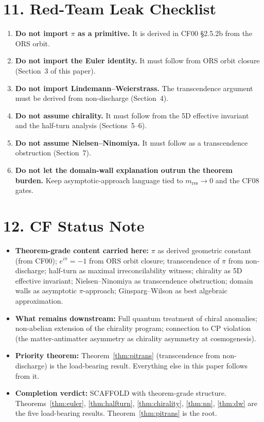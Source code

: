 \documentclass[11pt]{article}
\theoremstyle{definition}
\theoremstyle{remark}
\begin{document}
\section{11. Red-Team Leak Checklist}

\begin{enumerate}[label=\textbf{R\arabic*.},leftmargin=1.8em]
\item \textbf{Do not import $\pi$ as a primitive.} It is derived in
  CF00 \S 2.5.2b from the ORS orbit.
\item \textbf{Do not import the Euler identity.} It must follow from
  ORS orbit closure (Section~3 of this paper).
\item \textbf{Do not import Lindemann--Weierstrass.} The transcendence
  argument must be derived from non-discharge (Section~4).
\item \textbf{Do not assume chirality.} It must follow from the 5D
  effective invariant and the half-turn analysis (Sections~5--6).
\item \textbf{Do not assume Nielsen--Ninomiya.} It must follow as a
  transcendence obstruction (Section~7).
\item \textbf{Do not let the domain-wall explanation outrun the
  theorem burden.} Keep asymptotic-approach language tied to
  $m_\text{res}\to 0$ and the CF08 gates.
\end{enumerate}

\section{12. CF Status Note}

\begin{itemize}
\item \textbf{Theorem-grade content carried here:} $\pi$ as derived
  geometric constant (from CF00); $e^{i\pi}=-1$ from ORS orbit closure;
  transcendence of $\pi$ from non-discharge; half-turn as maximal
  irreconcilability witness; chirality as 5D effective invariant;
  Nielsen--Ninomiya as transcendence obstruction; domain walls as
  asymptotic $\pi$-approach; Ginsparg--Wilson as best algebraic
  approximation.
\item \textbf{What remains downstream:} Full quantum treatment of
  chiral anomalies; non-abelian extension of the chirality program;
  connection to CP violation (the matter-antimatter asymmetry as
  chirality asymmetry at cosmogenesis).
\item \textbf{Priority theorem:} Theorem~\ref{thm:pitrans}
  (transcendence from non-discharge) is the load-bearing result.
  Everything else in this paper follows from it.
\item \textbf{Completion verdict:} SCAFFOLD with theorem-grade structure.
  Theorems~\ref{thm:euler}, \ref{thm:halfturn}, \ref{thm:chirality},
  \ref{thm:nn}, \ref{thm:dw} are the five load-bearing results.
  Theorem~\ref{thm:pitrans} is the root.
\end{itemize}
\end{document}
